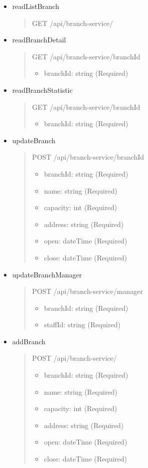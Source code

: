 \begin{itemize}
	\item readListBranch
	\begin{quote}
		GET /api/branch-service/
	\end{quote}


	\item readBranchDetail
	\begin{quote}
		GET /api/branch-service/{branchId}
		\begin{itemize}
			\item branchId: string (Required)
			\end{itemize}
	\end{quote}

	\item readBranchStatistic
	\begin{quote}
		GET /api/branch-service/{branchId}
		\begin{itemize}
			\item branchId: string (Required)
		\end{itemize}
	\end{quote}

	\item updateBranch
	\begin{quote}
		POST /api/branch-service/{branchId}
		\begin{itemize}
			\item branchId: string (Required)
			\item name: string (Required)
			\item capacity: int (Required)
			\item address: string (Required)
			\item open: dateTime (Required)
			\item close: dateTime (Required)
		\end{itemize}
	\end{quote}

	\item updateBranchManager
	\begin{quote}
		POST /api/branch-service/manager
		\begin{itemize}
			\item branchId: string (Required)
			\item staffId: string (Required)
			\end{itemize}
	\end{quote}

	\item addBranch
	\begin{quote}
		POST /api/branch-service/
		\begin{itemize}
			\item branchId: string (Required)
			\item name: string (Required)
			\item capacity: int (Required)
			\item address: string (Required)
			\item open: dateTime (Required)
			\item close: dateTime (Required)
		\end{itemize}
	\end{quote}


\end{itemize}
